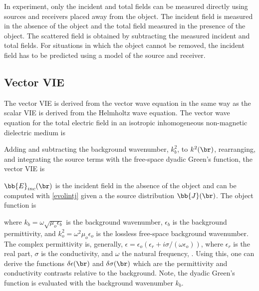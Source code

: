 In experiment, only the incident and total fields can be measured directly using sources and receivers placed away from the object. The incident field is measured in the absence of the object and the total field measured in the presence of the object. The scattered field is obtained by subtracting the measured incident and total fields. For situations in which the object cannot be removed, the incident field has to be predicted using a model of the source and receiver. %

\subsection{Vector VIE}

The vector VIE is derived from the vector wave equation in the same way as the scalar VIE is derived from the Helmholtz wave equation. The vector wave equation for the total electric field in an isotropic inhomogeneous non-magnetic dielectric medium is \cite{chew1995waves}

Adding and subtracting the background wavenumber, $k_b^2$, to $k^2(\br)$, rearranging, and integrating the source terms with the free-space dyadic Green's function, the vector VIE is 

$\bb{E}_{inc}(\br)$ is the incident field in the absence of the object and can be computed with \eqref{evolintj} given a the source distribution $\bb{J}(\br)$. The object function is 

\noindent where $k_b = \omega\sqrt{\mu_o\epsilon_b}$ is the background wavenumber, $\epsilon_b$ is the background permittivity, and $k_o^2 = \omega^2\mu_o\epsilon_o$ is the lossless free-space background wavenumber. The complex permittivity is, generally, $\epsilon = \epsilon_o(\epsilon_r + i\sigma/(\omega\epsilon_o))$, where $\epsilon_r$ is the real part, $\sigma$ is the conductivity, and $\omega$ the natural frequency, \cite{chew1995waves}. Using this, one can derive the functions $\delta\epsilon(\br)$ and $\delta \sigma(\br)$ which are the permittivity and conductivity contrasts relative to the background. Note, the dyadic Green's function is evaluated with the background wavenumber $k_b$. 

